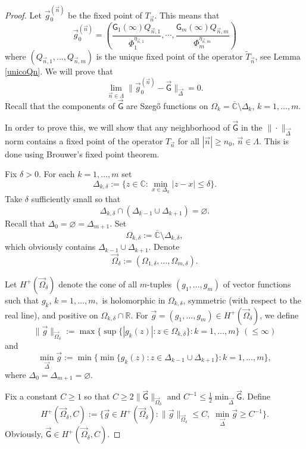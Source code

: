 \documentclass{amsart}
\numberwithin{equation}{section}
\theoremstyle{definition}
\newcommand{\RR}{\mathbb{R}}      %
\newcommand{\n}{\vec{n}}          %
\begin{document}
 \begin{proof}
 	Let $\vec{g}_0^{(\n)}$ be the fixed point of $T_{\n}$. This means that
 \[  \vec{g}_0^{(\n)} =   \left(\frac{\mathsf{G}_1(\infty)Q_{\n,1}}{\Phi_1^{\eta_{\n,1}}},\cdots,\frac{\mathsf{G}_m(\infty)Q_{\n,m}}{\Phi_m^{\eta_{\n,m}}}\right)
 \]
 where $(Q_{\n,1},\ldots,Q_{\n,m})$ is the unique fixed point of the operator $\tilde{T}_{\n}$, see Lemma \ref{unicoQn}. We will prove that
 	\begin{equation}
 		\label{fixed}
 		\lim_{\n\in\Lambda}\|\vec{g}_0^{(\n)} - \vec{\mathsf{G}}\|_{ \vec{\Delta}} =0.
 	\end{equation}
 	Recall that the components of $\vec{\mathsf{G}}$ are Szeg\H{o} functions on $\Omega_k = \overline{\mathbb{C}} \setminus \Delta_k
 $, $k=1,\ldots,m$.

 In order to prove this, we will show that any neighborhood of $\vec{\mathsf{G}}$ in the $\|\cdot\|_{ \vec{\Delta}}$ norm contains a fixed point of the operator $T_{\n}$ for all $|\n| \geq n_0$, $\n \in \Lambda$. This is done using Brouwer's fixed point theorem.

 Fix $\delta > 0$. For each $k=1,\ldots,m$ set
 \[ \Delta_{k,\delta} := \{z \in \mathbb{C}: \min_{x \in \Delta_k} |z - x| \leq \delta\}.
 \]
 Take $\delta $ sufficiently small so that
 \[ \Delta_{k,\delta} \cap (\Delta_{k-1} \cup \Delta_{k+1}) =  \varnothing.
 \]
 Recall that $\Delta_0 = \varnothing= \Delta_{m+1}$. Set
 \[ \Omega_{k,\delta} := \overline{\mathbb{C}} \setminus \Delta_{k,\delta},
 \]
 which obviously contains $\Delta_{k-1} \cup \Delta_{k+1}$. Denote
 \[ \vec{\Omega}_{\delta} := (\Omega_{1,\delta},\ldots,\Omega_{m,\delta}).
 \]
 	
 	Let $H^+(\vec{\Omega}_{\delta})$ denote the cone of all $m$-tuples $(g_1,\ldots,g_m)$ of vector functions such that $g_k$, $k=1,\ldots,m,$ is holomorphic in $\Omega_{k,\delta}$, symmetric (with respect to the real line), and positive on $\Omega_{k,\delta}\cap\RR$. For $\vec{g} = (g_1,\ldots,g_m) \in H^+(\vec{\Omega}_{\delta})$, we define
 	\[ \|\vec{g}\|_{\vec{\Omega}_{\delta}} := \max\{\sup\{|g_k(z)|: z\in \Omega_{k,\delta}\}:k=1,\ldots,m\}\,\,(\leq \infty)
 	\]
 	and
 	\[  \min_{\vec{\Delta}} \vec{g} := \min \{\min  \{g_k(z): z\in \Delta_{k-1}\cup\Delta_{k+1}\}: k=1,\ldots,m\},
 	\]
 	where $\Delta_0=\Delta_{m+1}=\varnothing$.
 	
 	Fix a constant $C\geq 1$ so that $C \geq 2 \|\vec{\mathsf{G}}\|_{\vec{\Omega}_{\delta}} $ and $ C^{-1} \leq \frac{1}{2} \min_{\vec{\Delta}} \vec{\mathsf{G}}$. Define
 	\[  H^+(\vec{\Omega}_{\delta}, C) := \{\vec{g}\in H^+(\vec{\Omega}_{\delta}): \|\vec{g}\|_{\vec{\Omega}_{\delta}}\leq C,\; \min_{\vec{\Delta}} \vec{g}\geq C^{-1}\}.
 	\]
 	Obviously, $\vec{\mathsf{G}}\in H^+(\vec{\Omega}_{\delta}, C)$.
 	

\end{proof}
\end{document}
